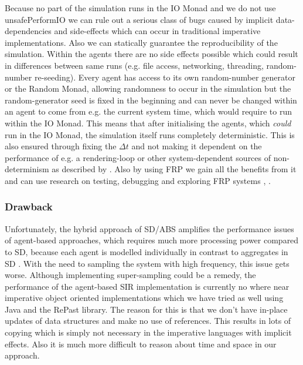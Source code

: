 Because no part of the simulation runs in the IO Monad and we do not use unsafePerformIO we can rule out a serious class of bugs caused by implicit data-dependencies and side-effects which can occur in traditional imperative implementations. Also we can statically guarantee the reproducibility of the simulation. Within the agents there are no side effects possible which could result in differences between same runs (e.g. file access, networking, threading, random-number re-seeding). Every agent has access to its own random-number generator or the Random Monad, allowing randomness to occur in the simulation but the random-generator seed is fixed in the beginning and can never be changed within an agent to come from e.g. the current system time, which would require to run within the IO Monad. This means that after initialising the agents, which \textit{could} run in the IO Monad, the simulation itself runs completely deterministic. This is also ensured through fixing the $\Delta t$ and not making it dependent on the performance of e.g. a rendering-loop or other system-dependent sources of non-determinism as described by \cite{perez_testing_2017}. Also by using FRP we gain all the benefits from it and can use research on testing, debugging and exploring FRP systems \cite{perez_testing_2017}, \cite{perez_back_2017}.

\subsubsection{Drawback}
Unfortunately, the hybrid approach of SD/ABS amplifies the performance issues of agent-based approaches, which requires much more processing power compared to SD, because each agent is modelled individually in contrast to aggregates in SD \cite{macal_agent-based_2010}. With the need to sampling the system with high frequency, this issue gets worse. Although implementing super-sampling could be a remedy, the performance of the agent-based SIR implementation is currently no where near imperative object oriented implementations which we have tried as well using Java and the RePast library. The reason for this is that we don't have in-place updates of data structures and make no use of references. This results in lots of copying which is simply not necessary in the imperative languages with implicit effects. Also it is much more difficult to reason about time and space in our approach. 

